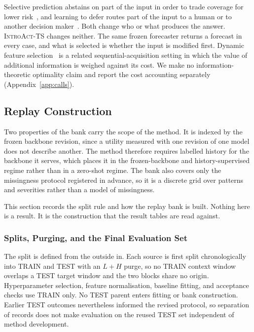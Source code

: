 \documentclass{article}
\newcommand{\introact}{\textsc{IntroAct-TS}}
\begin{document}
Selective prediction abstains on part of the input in order to trade coverage for lower
risk~\citep{chow1970optimum,vovk2005algorithmic,geifman2017selective,lei2018distribution}, and
learning to defer routes part of the input to a human or to another decision
maker~\citep{madras2018predict,mozannar2020consistent}. Both change who or what produces the
answer. \introact{} changes neither. The same frozen forecaster returns a forecast in every
case, and what is selected is whether the input is modified first. Dynamic feature
selection~\citep{he2024dime} is a related sequential-acquisition setting in which the value of
additional information is weighed against its cost. We make no information-theoretic
optimality claim and report the cost accounting separately (Appendix~\ref{app:calls}).

\subsection{Replay Construction}
\label{app:replay}
Two properties of the bank carry the scope of the method. It is indexed by the frozen backbone
revision, since a utility measured with one revision of one model does not describe another.
The method therefore requires labelled history for the backbone it serves, which places it in
the frozen-backbone and history-supervised regime rather than in a zero-shot regime. The bank also
covers only the missingness protocol registered in advance, so it is a discrete grid over
patterns and severities rather than a model of missingness.

This section records the split rule and how the replay bank is built. Nothing here is a
result. It is the construction that the result tables are read against.

\subsubsection{Splits, Purging, and the Final Evaluation Set}
\label{app:splits}
The split is defined from the outside in. Each source is first split chronologically into
TRAIN and TEST with an $L + H$ purge, so no TRAIN context window overlaps a TEST target window
and the two blocks share no origin. Hyperparameter selection, feature normalisation, baseline
fitting, and acceptance checks use TRAIN only. No TEST parent enters fitting or bank construction.
Earlier TEST outcomes nevertheless informed the revised protocol, so separation of records
does not make evaluation on the reused TEST set independent of method development.
\end{document}
